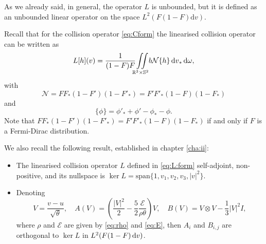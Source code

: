 As we already said, in general, the operator $L$ is unbounded, but it is defined as an unbounded linear operator on the space $L^2(F(1-F)\mathrm dv)$. 

Recall that for the collision operator \eqref{eq:Cform} the linearised collision operator can be written as
   \begin{equation*}%
   	L[h](v)=\frac{1}{ (1-F)F }\col b\mathcal N \{h \} \dv_\ast\dom ,
   \end{equation*}
with\[\mathcal N = FF_\ast(1-F')(1-F'_\ast)=F'F'_\ast(1-F)(1-F_\ast)\]
and\[\{\phi\}=\phi'_\ast+\phi'-\phi_\ast-\phi.\]
Note that $FF_\ast(1-F')(1-F'_\ast)=F'F'_\ast(1-F)(1-F_\ast)$ if and only if $F$ is a Fermi-Dirac distribution.

We also recall the following result, established in chapter \ref{cha:ii}:


\begin{theorem*}  \begin{itemize}
\item 
  The linearised collision operator $L$ defined in \eqref{eq:L:form} self-ad\-joint, non-positive, and its nullspace is $\ker L = \mbox{span}\{1,v_1,v_2,v_3,|v|^2\}$. 
 \item 
Denoting \[V=\frac{v-u}{\sqrt\theta}, \quad A(V)=\left(\frac{|V|^2}{2}-\frac52   \frac{\mathcal E}{\rho\theta}\right)V,\quad B(V)=V\otimes V-\frac 13 |V|^2I,\]
where $\rho$ and $\mathcal E$ are given by \eqref{eq:rho} and \eqref{eq:E}, then $A_i$ and
$B_{i,j}$   are orthogonal to $\ker L$ in $L^2(F(1-F) {\,\mathrm{d} v})$.\end{itemize}
\end{theorem*}


